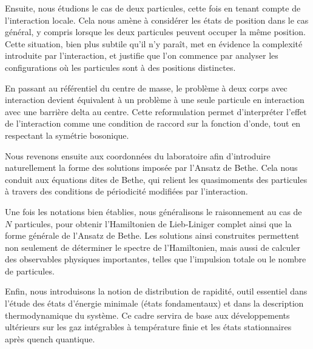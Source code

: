 Ensuite, nous étudions le cas de deux particules, cette fois en tenant compte de l’interaction locale. Cela nous amène à considérer les états de position dans le cas général, y compris lorsque les deux particules peuvent occuper la même position. Cette situation, bien plus subtile qu’il n’y paraît, met en évidence la complexité introduite par l’interaction, et justifie que l’on commence par analyser les configurations où les particules sont à des positions distinctes.

En passant au référentiel du centre de masse, le problème à deux corps avec interaction devient équivalent à un problème à une seule particule en interaction avec une barrière delta au centre. Cette reformulation permet d’interpréter l’effet de l’interaction comme une condition de raccord sur la fonction d’onde, tout en respectant la symétrie bosonique.

Nous revenons ensuite aux coordonnées du laboratoire afin d’introduire naturellement la forme des solutions imposée par l’Ansatz de Bethe. Cela nous conduit aux équations dites de Bethe, qui relient les quasimoments des particules à travers des conditions de périodicité modifiées par l’interaction.

Une fois les notations bien établies, nous généralisons le raisonnement au cas de \(N\) particules, pour obtenir l’Hamiltonien de Lieb-Liniger complet ainsi que la forme générale de l’Ansatz de Bethe. Les solutions ainsi construites permettent non seulement de déterminer le spectre de l’Hamiltonien, mais aussi de calculer des observables physiques importantes, telles que l’impulsion totale ou le nombre de particules.

Enfin, nous introduisons la notion de distribution de rapidité, outil essentiel dans l’étude des états d’énergie minimale (états fondamentaux) et dans la description thermodynamique du système. Ce cadre servira de base aux développements ultérieurs sur les gaz intégrables à température finie et les états stationnaires après quench quantique.


